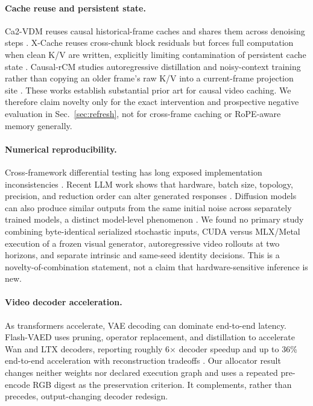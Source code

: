 \documentclass[10pt,twocolumn]{article}
\begin{document}
\paragraph{Cache reuse and persistent state.}
Ca2-VDM reuses causal historical-frame caches and shares them across denoising steps \cite{ca2vdm}. X-Cache reuses cross-chunk block residuals but forces full computation when clean K/V are written, explicitly limiting contamination of persistent cache state \cite{xcache}. Causal-rCM studies autoregressive distillation and noisy-context training rather than copying an older frame's raw K/V into a current-frame projection site \cite{causalrcm}. These works establish substantial prior art for causal video caching. We therefore claim novelty only for the exact intervention and prospective negative evaluation in Sec.~\ref{sec:refresh}, not for cross-frame caching or RoPE-aware memory generally.

\paragraph{Numerical reproducibility.}
Cross-framework differential testing has long exposed implementation inconsistencies \cite{cradle}. Recent LLM work shows that hardware, batch size, topology, precision, and reduction order can alter generated responses \cite{yuan2025}. Diffusion models can also produce similar outputs from the same initial noise across separately trained models, a distinct model-level phenomenon \cite{diffrepro}. We found no primary study combining byte-identical serialized stochastic inputs, CUDA versus MLX/Metal execution of a frozen visual generator, autoregressive video rollouts at two horizons, and separate intrinsic and same-seed identity decisions. This is a novelty-of-combination statement, not a claim that hardware-sensitive inference is new.

\paragraph{Video decoder acceleration.}
As transformers accelerate, VAE decoding can dominate end-to-end latency. Flash-VAED uses pruning, operator replacement, and distillation to accelerate Wan and LTX decoders, reporting roughly 6$\times$ decoder speedup and up to 36\% end-to-end acceleration with reconstruction tradeoffs \cite{flashvaed}. Our allocator result changes neither weights nor declared execution graph and uses a repeated pre-encode RGB digest as the preservation criterion. It complements, rather than precedes, output-changing decoder redesign.
\end{document}
